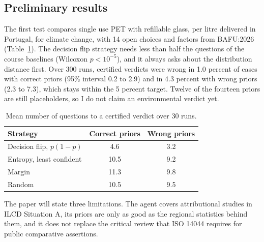 \documentclass{article}
\begin{document}
\subsection{Preliminary results}
The first test compares single use PET with refillable glass, per litre delivered in Portugal, for
climate change, with 14 open choices and factors from BAFU:2026 (Table~\ref{tab:prelim}). The decision
flip strategy needs less than half the questions of the course baselines (Wilcoxon $p<10^{-5}$), and it
always asks about the distribution distance first. Over 300 runs, certified verdicts were wrong in 1.0
percent of cases with correct priors (95\% interval 0.2 to 2.9) and in 4.3 percent with wrong priors
(2.3 to 7.3), which stays within the 5 percent target. Twelve of the fourteen priors are still
placeholders, so I do not claim an environmental verdict yet.

\begin{table}[h]
\vspace{-4pt}
\centering
\small
\begin{tabular}{lcc}
\toprule
Strategy & Correct priors & Wrong priors\\
\midrule
Decision flip, $p(1-p)$ & 4.6 & 3.2\\
Entropy, least confident & 10.5 & 9.2\\
Margin & 11.3 & 9.8\\
Random & 10.5 & 9.5\\
\bottomrule
\end{tabular}
\caption{Mean number of questions to a certified verdict over 30 runs.}
\label{tab:prelim}
\vspace{-8pt}
\end{table}

The paper will state three limitations. The agent covers attributional studies in ILCD Situation A,
its priors are only as good as the regional statistics behind them, and it does not replace the critical
review that ISO 14044 requires for public comparative assertions.
\end{document}

